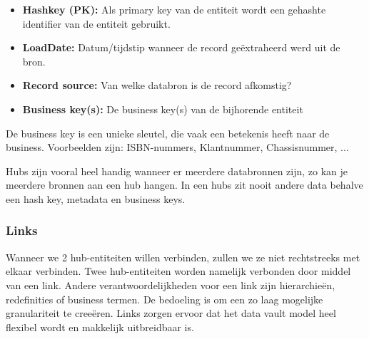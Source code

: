\begin{itemize}
	\item \textbf{Hashkey (PK):} Als primary key van de entiteit wordt een gehashte identifier van de entiteit gebruikt.
	\item \textbf{LoadDate:} Datum/tijdstip wanneer de record geëxtraheerd werd uit de bron.
	\item \textbf{Record source:} Van welke databron is de record afkomstig?
	\item \textbf{Business key(s):} De business key(s) van de bijhorende entiteit
\end{itemize} 

 De business key is een unieke sleutel, die vaak een betekenis heeft naar de business. Voorbeelden zijn: ISBN-nummers, Klantnummer, Chassisnummer, ...
 
 Hubs zijn vooral heel handig wanneer er meerdere databronnen zijn, zo kan je meerdere bronnen aan een hub hangen. In een hubs zit nooit andere data behalve een hash key, metadata en business keys.

\subsubsection{Links}
Wanneer we 2 hub-entiteiten willen verbinden, zullen we ze niet rechtstreeks met elkaar verbinden. Twee hub-entiteiten worden namelijk verbonden door middel van een link. Andere verantwoordelijkheden voor een link zijn hierarchieën, redefinities of business termen. De bedoeling is om een zo laag mogelijke granulariteit te creeëren. Links zorgen ervoor dat het data vault model heel flexibel wordt en makkelijk uitbreidbaar is. 

